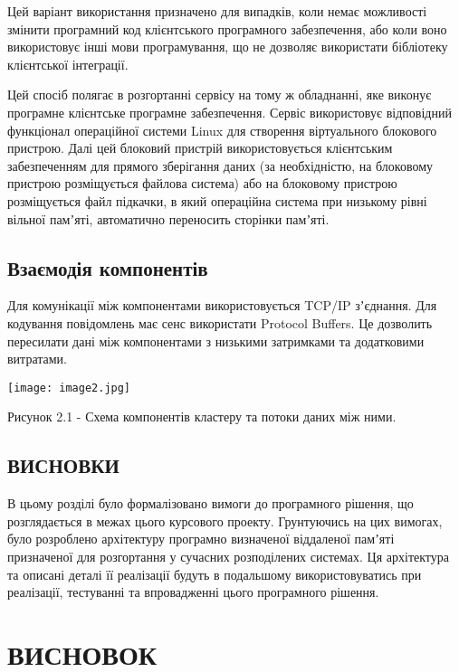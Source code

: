 Цей варіант використання призначено для випадків, коли немає можливості змінити програмний код клієнтського програмного забезпечення, або коли воно використовує інші мови програмування, що не дозволяє використати бібліотеку клієнтської інтеграції.

Цей спосіб полягає в розгортанні сервісу на тому ж обладнанні, яке виконує програмне клієнтське програмне забезпечення. Сервіс використовує відповідний функціонал операційної системи Linux для створення віртуального блокового пристрою. Далі цей блоковий пристрій використовується клієнтським забезпеченням для прямого зберігання даних (за необхідністю, на блоковому пристрою розміщується файлова система) або на блоковому пристрою розміщується файл підкачки, в який операційна система при низькому рівні вільної памʼяті, автоматично переносить сторінки памʼяті.

\section {Взаємодія компонентів}

Для комунікації між компонентами використовується TCP/IP зʼєднання. Для кодування повідомлень має сенс використати Protocol Buffers. Це дозволить пересилати дані між компонентами з низькими затримками та додатковими витратами.

\texttt{[image: image2.jpg]}

Рисунок 2.1 - Схема компонентів кластеру та потоки даних між ними.

\section{ВИСНОВКИ}

В цьому розділі було формалізовано вимоги до програмного рішення, що розглядається в межах цього курсового проекту. Грунтуючись на цих вимогах, було розроблено архітектуру програмно визначеної віддаленої памʼяті призначеної для розгортання у сучасних розподілених системах. Ця архітектура та описані деталі її реалізації будуть в подальшому використовуватись при реалізації, тестуванні та впровадженні цього програмного рішення.

\chapter{ВИСНОВОК}

